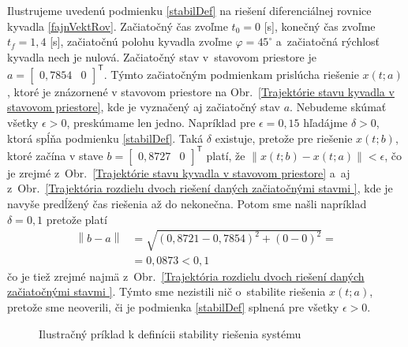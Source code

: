 \documentclass[a4paper, 10pt, ]{article}
\begin{document}
Ilustrujeme uvedenú podmienku \eqref{stabilDef} na riešení diferenciálnej rovnice kyvadla \eqref{fajnVektRov}. Začiatočný čas zvoľme $t_0 = 0$ [s], konečný čas zvoľme $t_f = 1,4$ [s], začiatočnú polohu kyvadla zvoľme $\varphi = 45^{\circ}$ a~začiatočná rýchlosť kyvadla nech je nulová. Začiatočný stav v~stavovom priestore je $a = \begin{bmatrix} 0,7854 & 0 \end{bmatrix}^\mathsf{T}$. Týmto začiatočným podmienkam prislúcha riešenie $x(t;a)$, ktoré je znázornené v stavovom priestore na Obr.~\ref{Trajektórie stavu kyvadla v stavovom priestore}, kde je vyznačený aj začiatočný stav $a$. Nebudeme skúmať všetky $\epsilon > 0$, preskúmame len jedno. Napríklad pre $\epsilon = 0,15$ hľadájme $\delta > 0$, ktorá spĺňa podmienku \eqref{stabilDef}. Taká $\delta$ existuje, pretože pre riešenie $x(t;b)$, ktoré začína v stave $b = \begin{bmatrix} 0,8727 & 0 \end{bmatrix}^\mathsf{T}$ platí, že $\left\| x(t;b) - x(t;a) \right\| < \epsilon$, čo je zrejmé z~Obr.~\ref{Trajektórie stavu kyvadla v stavovom priestore} a~aj z~Obr.~\ref{Trajektória rozdielu dvoch riešení daných začiatočnými stavmi }, kde je navyše predĺžený čas riešenia až do nekonečna. Potom sme našli napríklad $\delta = 0,1$ pretože platí
\begin{equation}
	\begin{split}
		\left\| b - a \right\| &= \sqrt{(0,8721 - 0,7854)^2 + (0 - 0)^2} = \\
		&= 0,0873 < 0,1
	\end{split}
\end{equation}
čo je tiež zrejmé najmä z~Obr.~\ref{Trajektória rozdielu dvoch riešení daných začiatočnými stavmi }. Týmto sme nezistili nič o~stabilite riešenia $x(t;a)$, pretože sme neoverili, či je podmienka \eqref{stabilDef} splnená pre všetky $\epsilon > 0$.


\begin{figure}[t]
	\centering

	\subfloat[]{\label{Trajektórie stavu kyvadla v stavovom priestore}}%
	\subfloat[]{\label{Trajektória rozdielu dvoch riešení daných začiatočnými stavmi }}%

		\vspace{-10mm}
	\caption{Ilustračný príklad k definícii stability riešenia systému}
	\label{Ilustračný príklad k definícii stability riešenia systému}
\end{figure}
\end{document}
